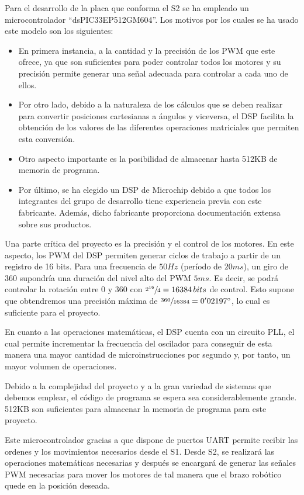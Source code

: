 Para el desarrollo de la placa que conforma el \ac{S2} se ha empleado un microcontrolador ``dsPIC33EP512GM604''.
Los motivos por los cuales se ha usado este modelo son los siguientes: 

\begin{itemize}
 \item En primera instancia, a la cantidad y la precisión de los \ac{PWM} que este ofrece, ya que son suficientes para poder controlar todos los motores y su precisión permite generar una señal adecuada para controlar a cada uno de ellos.

 \item Por otro lado, debido a la naturaleza de los cálculos que se deben realizar para convertir posiciones cartesianas a ángulos y viceversa, el \ac{DSP} facilita la obtención de los valores de las diferentes operaciones matriciales que permiten esta conversión.

 \item Otro aspecto importante es la posibilidad de almacenar hasta 512KB de memoria de programa.

 \item Por último, se ha elegido un \ac{DSP} de Microchip debido a que todos los integrantes del grupo de desarrollo tiene experiencia previa con este fabricante. Además, dicho fabricante proporciona documentación extensa sobre sus productos.
\end{itemize}

Una parte crítica del proyecto es la precisión y el control de los motores. En este aspecto, los \ac{PWM} del \ac{DSP} permiten generar ciclos de trabajo a partir de un registro de 16 bits. Para una frecuencia de $50Hz$ (período de $20ms$), un giro de 360\degree{} supondría una duración del nivel alto del \ac{PWM} $5ms$. Es decir, se podrá controlar la rotación entre 0\degree{} y 360\degree{} con 
$\sfrac{2^{16}}{4} = 16384\,bits$ de control. Esto supone que obtendremos una precisión máxima de $\sfrac{360}{16384} = 0'02197\degree{}$, lo cual es suficiente para el proyecto.

En cuanto a las operaciones matemáticas, el \ac{DSP} cuenta con un circuito \ac{PLL}, el cual permite incrementar la frecuencia del oscilador para conseguir de esta manera una mayor cantidad de microinstrucciones por segundo y, por tanto, un mayor volumen de operaciones.

Debido a la complejidad del proyecto y a la gran variedad de sistemas que debemos emplear, el código de programa se espera sea considerablemente grande. 512KB son suficientes para almacenar la memoria de programa para este proyecto.

Este microcontrolador gracias a que dispone de puertos \ac{UART} permite recibir las ordenes y los movimientos necesarios desde el \ac{S1}. Desde \ac{S2}, se realizará las operaciones matemáticas necesarias y después se encargará de generar las señales \ac{PWM} necesarias para mover los motores de tal manera que el brazo robótico quede en la posición deseada.
